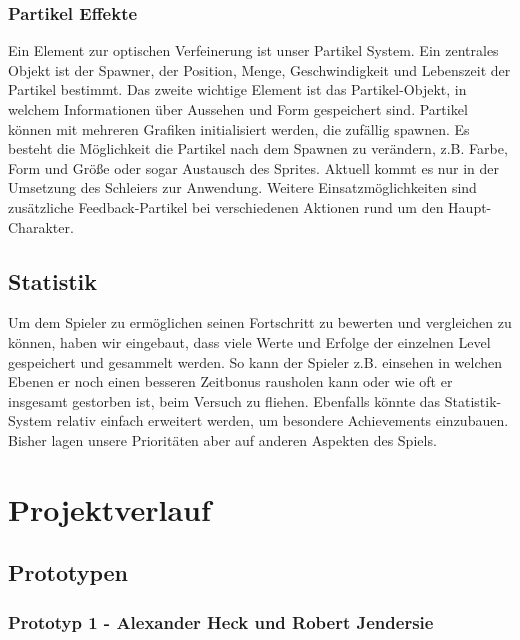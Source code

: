 \documentclass[10pt]{article}
\begin{document}
\vspace{0.5cm}
\subsubsection{Partikel Effekte}
Ein Element zur optischen Verfeinerung ist unser Partikel System.
Ein zentrales Objekt ist der Spawner, der Position, Menge, Geschwindigkeit und Lebenszeit der Partikel bestimmt. Das zweite wichtige Element ist das Partikel-Objekt, in welchem Informationen über Aussehen und Form gespeichert sind. Partikel können mit mehreren Grafiken initialisiert werden, die zufällig spawnen. Es besteht die Möglichkeit die Partikel nach dem Spawnen zu verändern, z.B. Farbe, Form und Größe oder sogar Austausch des Sprites.
Aktuell kommt es nur in der Umsetzung des Schleiers zur Anwendung.
Weitere Einsatzmöglichkeiten sind zusätzliche Feedback-Partikel bei verschiedenen Aktionen rund um den Haupt-Charakter.

\vspace{0.5cm}
\subsection{Statistik}
Um dem Spieler zu ermöglichen seinen Fortschritt zu bewerten und vergleichen zu können, haben wir eingebaut, dass viele Werte und Erfolge der einzelnen Level gespeichert und gesammelt werden. So kann der Spieler z.B. einsehen in welchen Ebenen er noch einen besseren Zeitbonus rausholen kann oder wie oft er insgesamt gestorben ist, beim Versuch zu fliehen. \newline
Ebenfalls könnte das Statistik-System relativ einfach erweitert werden, um besondere Achievements einzubauen. Bisher lagen unsere Prioritäten aber auf anderen Aspekten des Spiels.

\newpage
\section{Projektverlauf}

\vspace{0.5cm}
\subsection{Prototypen}

\vspace{0.5cm}
\subsubsection{Prototyp 1 - Alexander Heck und Robert Jendersie}
\end{document}
